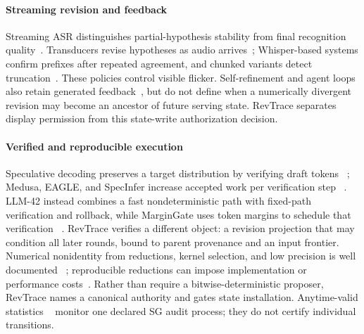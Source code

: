 
\paragraph{Streaming revision and feedback}
Streaming ASR distinguishes partial-hypothesis stability from final recognition
quality~\cite{selfridge2011stability,shangguan2020stability}. Transducers revise
hypotheses as audio arrives~\cite{graves2012transduction}; Whisper-based systems
confirm prefixes after repeated agreement, and chunked variants detect
truncation~\cite{machacek2023whisperstreaming,radford2023whisper,wang2024simulwhisper}.
These policies control visible flicker. Self-refinement and agent loops also
retain generated feedback~\cite{madaan2023selfrefine,shinn2023reflexion}, but do
not define when a numerically divergent revision may become an ancestor of
future serving state. RevTrace separates display permission from this
state-write authorization decision.

\paragraph{Verified and reproducible execution}
Speculative decoding preserves a target distribution by verifying draft tokens
~\cite{leviathan2023specdec,chen2023specsample}; Medusa, EAGLE, and SpecInfer
increase accepted work per verification step
~\cite{cai2024medusa,li2024eagle,miao2024specinfer}. LLM-42 instead combines a
fast nondeterministic path with fixed-path verification and rollback, while
MarginGate uses token margins to schedule that verification
~\cite{zhang2026llm42,chu2026margingate}. RevTrace verifies a different object:
a revision projection that may condition all later rounds, bound to parent
provenance and an input frontier. Numerical nonidentity from reductions, kernel
selection, and low precision is well documented
~\cite{yuan2025numerical,antunes2024reprohpc}; reproducible reductions can impose
implementation or performance costs~\cite{demmel2013reprosum,mueller2018reproagg}.
Rather than require a bitwise-deterministic proposer, RevTrace names a canonical
authority and gates state installation. Anytime-valid statistics
~\cite{howard2021confidence,ramdas2023savi,grunwald2024safetesting} monitor one
declared SG audit process; they do not certify individual transitions.

